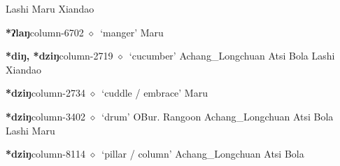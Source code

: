 \hspace{1ex}
         Lashi 
\hspace{1ex}
         Maru 
\hspace{1ex}
         Xiandao 
  \item {\footnotesize \textbf{*ʔlaŋ}}{\tiny column-6702}
         $\diamond$~`manger'
         Maru 
  \item {\footnotesize \textbf{*diŋ, *dziŋ}}{\tiny column-2719}
         $\diamond$~`cucumber'
         Achang\_Longchuan 
\hspace{1ex}
         Atsi 
\hspace{1ex}
         Bola 
\hspace{1ex}
         Lashi 
\hspace{1ex}
         Xiandao 
  \item {\footnotesize \textbf{*dziŋ}}{\tiny column-2734}
         $\diamond$~`cuddle / embrace'
         Maru 
  \item {\footnotesize \textbf{*dziŋ}}{\tiny column-3402}
         $\diamond$~`drum'
         OBur. 
\hspace{1ex}
         Rangoon 
\hspace{1ex}
         Achang\_Longchuan 
\hspace{1ex}
         Atsi 
\hspace{1ex}
         Bola 
\hspace{1ex}
         Lashi 
\hspace{1ex}
         Maru 
  \item {\footnotesize \textbf{*dziŋ}}{\tiny column-8114}
         $\diamond$~`pillar / column'
         Achang\_Longchuan 
\hspace{1ex}
         Atsi 
\hspace{1ex}
         Bola 
